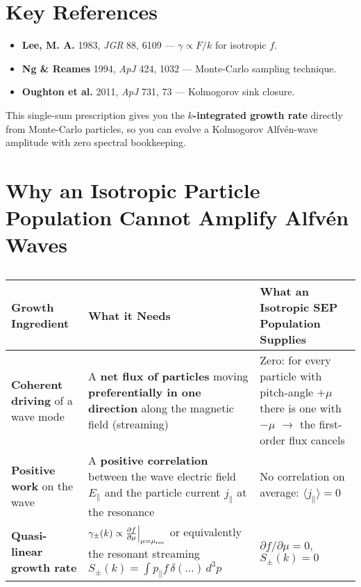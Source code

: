 \section*{Key References}

\begin{itemize}
\item \textbf{Lee, M. A.} 1983, \textit{JGR} 88, 6109 --- $\gamma \propto F/k$ for isotropic $f$.
\item \textbf{Ng \& Reames} 1994, \textit{ApJ} 424, 1032 --- Monte-Carlo sampling technique.
\item \textbf{Oughton et al.} 2011, \textit{ApJ} 731, 73 --- Kolmogorov sink closure.
\end{itemize}

\noindent
This single-sum prescription gives you the \textbf{$k$-integrated growth rate} directly from Monte-Carlo particles, so you can evolve a Kolmogorov Alfvén-wave amplitude with zero spectral bookkeeping.



\section{Why an \textbf{Isotropic Particle Population Cannot Amplify Alfvén Waves}}

\begin{table}[h!]
\centering
\begin{tabular}{|p{4cm}|p{5.5cm}|p{5.5cm}|}
\hline
\textbf{Growth Ingredient} & \textbf{What it Needs} & \textbf{What an \textbf{Isotropic} SEP Population Supplies} \\
\hline
\textbf{Coherent driving} of a wave mode & A \textbf{net flux of particles} moving \textbf{preferentially in one direction} along the magnetic field (streaming) & Zero: for every particle with pitch-angle $+\mu$ there is one with $-\mu$ $\rightarrow$ the first-order flux cancels \\
\hline
\textbf{Positive work} on the wave & A \textbf{positive correlation} between the wave electric field $E_\parallel$ and the particle current $j_\parallel$ at the resonance & No correlation on average: $\langle j_\parallel \rangle = 0$ \\
\hline
\textbf{Quasi-linear growth rate} & $\gamma_\pm(k) \propto \frac{\partial f}{\partial \mu}\Big|_{\mu = \mu_{\rm res}}$ or equivalently the resonant streaming $S_\pm(k) = \int p_\parallel f\,\delta(\dots)\,d^3p$ & $\partial f/\partial\mu = 0$, \quad $S_\pm(k) = 0$ \\
\hline
\end{tabular}
\caption*{}
\end{table}

